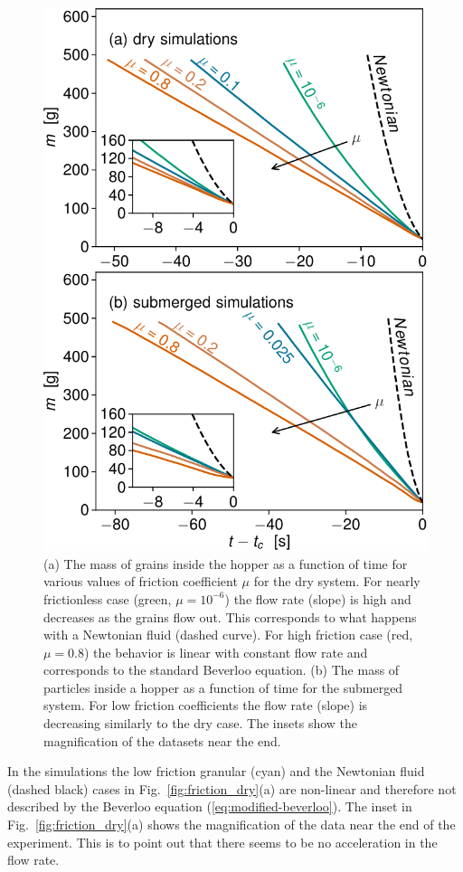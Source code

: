 \documentclass[twoside,twocolumn,9pt]{article}
\begin{document}
\begin{figure}[!t] %
 \includegraphics[width=\columnwidth]{fig6-m_vs_t.pdf}
\caption{(a) The mass of grains inside the hopper as a function of time for various values of friction coefficient $\mu$ for the dry system. For nearly frictionless case (green, $\mu=10^{-6}$) the flow rate (slope) is high and decreases as the grains flow out. This corresponds to what happens with a Newtonian fluid (dashed curve). For high friction case (red, $\mu=0.8$) the behavior is linear with constant flow rate and corresponds to the standard Beverloo equation. (b) The mass of particles inside a hopper as a function of time for the submerged system. For low friction coefficients the flow rate (slope) is decreasing similarly to the dry case. The insets show the magnification of the datasets near the end. }
 \label{fig:friction_dry} \label{fig:friction_sub}
\end{figure}
%
%
In the simulations the low friction granular (cyan) and the Newtonian fluid (dashed black) cases in Fig.~\ref{fig:friction_dry}(a) are non-linear and therefore not described by the Beverloo equation (\ref{eq:modified-beverloo}). 
The inset in Fig.~\ref{fig:friction_dry}(a) shows the magnification of the data near the end of the experiment. This is to point out that there seems to be no acceleration in the flow rate. 
\end{document}
